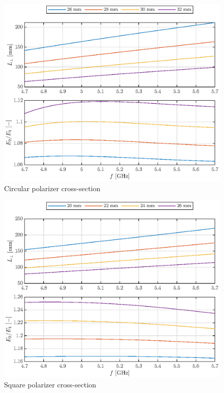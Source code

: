 \documentclass[11pt,a4paper,twoside,openany]{report}
\begin{document}
\begin{figure}[!ht]
    \centering
    \includegraphics[width=\textwidth]{src/circular_polarizer_cross_section.eps}
    \caption{\label{fig:circular-polarizer-cross-section}Circular polarizer cross-section}
\end{figure}

\begin{figure}[!ht]
    \centering
    \includegraphics[width=\textwidth]{src/square_polarizer_cross_section.eps}
    \caption{\label{fig:square-polarizer-cross-section}Square polarizer cross-section}
\end{figure}
\end{document}
